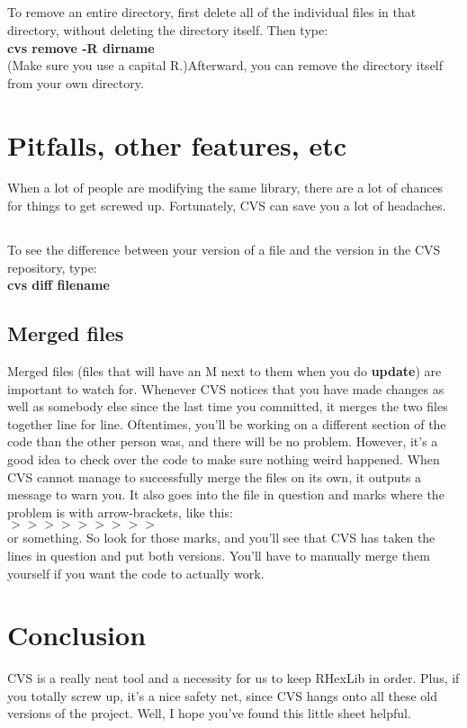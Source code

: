 \documentclass[12pt, letterpaper]{article}
\begin{document}
  \subsection{} 
To remove an entire directory, first delete all of the
individual files in that directory, without deleting the directory itself. Then type:\\
      {\bf cvs remove -R dirname }\\
      (Make sure you use a capital R.)Afterward, you can remove the
directory itself from your own directory.

\section{Pitfalls, other features, etc}
When a lot of people are modifying the same library, there are a lot
of chances for things to get screwed up. Fortunately, CVS can save you 
a lot of headaches.
  \subsection{} 
To see the difference between your version of a file and 
the version in the CVS repository, type:\\
      {\bf cvs diff filename }\\
  \subsection{Merged files}
Merged files (files that will have an M next to them when you do {\bf
update}) are important to watch for. Whenever CVS notices that you
have made changes as well as somebody else since the last time you
committed, it merges the two files together line for line. Oftentimes, 
you'll be working on a different section of the code than the other
person was, and there will be no problem. However, it's a good idea to 
check over the code to make sure nothing weird happened.
When CVS cannot manage to successfully merge the files on its own, it
outputs a message to warn you. It also goes into the file in question
and marks where the problem is with arrow-brackets, like this:\\
{\bf $>>>>>>>>>$ }\\
or something. So look for those marks, and you'll see that CVS has
taken the lines in question and put both versions. You'll have to
manually merge them yourself if you want the code to actually work.

\section*{Conclusion}
CVS is a really neat tool and a necessity for us to keep RHexLib in
order. Plus, if you totally screw up, it's a nice safety net, since
CVS hangs onto all these old versions of the project. Well, I hope
you've found this little sheet helpful.
\end{document}
